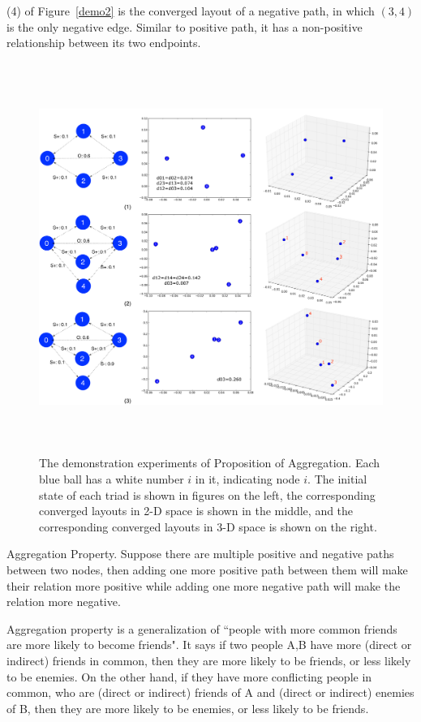 (4) of Figure~\ref{demo2} is the converged layout of a negative path, in which $(3,4)$ is the only negative edge. Similar to positive path, it has a non-positive relationship between its two endpoints.
\begin{figure}[th]
\centering
\includegraphics[height=5.0in]{Figs/demo3.pdf}
\caption{\label{demo3}The demonstration experiments of Proposition of Aggregation. Each blue ball has a white number $i$ in it, indicating node $i$. The initial state of each triad is shown in figures on the left, the corresponding converged layouts in 2-D space is shown in the middle, and the corresponding converged layouts in 3-D space is shown on the right.}
\end{figure}
\begin{proposition}\label{aggregation}
Aggregation Property. Suppose there are multiple positive and negative paths between two nodes, then adding one more positive path between them will make their relation more positive while adding one more negative path will make the relation more negative.
\end{proposition}
Aggregation property is a generalization of ``people with more common friends are more likely to become friends". It says if two people A,B have more (direct or indirect) friends in common, then they are more likely to be friends, or less likely to be enemies. On the other hand, if they have more conflicting people in common, who are (direct or indirect) friends of A and (direct or indirect) enemies of B, then they are more likely to be enemies, or less likely to be friends.  

